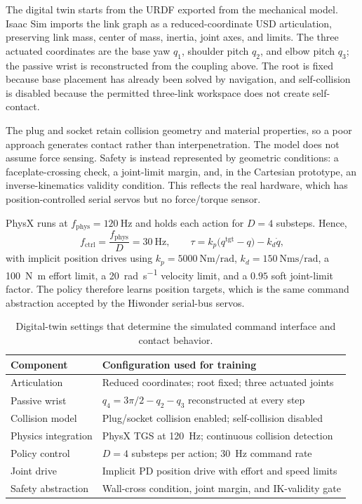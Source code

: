 The digital twin starts from the URDF exported from the mechanical model. Isaac Sim imports the link graph as a reduced-coordinate USD articulation, preserving link mass, center of mass, inertia, joint axes, and limits. The three actuated coordinates are the base yaw $q_1$, shoulder pitch $q_2$, and elbow pitch $q_3$; the passive wrist is reconstructed from the coupling above. The root is fixed because base placement has already been solved by navigation, and self-collision is disabled because the permitted three-link workspace does not create self-contact.

The plug and socket retain collision geometry and material properties, so a poor approach generates contact rather than interpenetration. The model does not assume force sensing. Safety is instead represented by geometric conditions: a faceplate-crossing check, a joint-limit margin, and, in the Cartesian prototype, an inverse-kinematics validity condition. This reflects the real hardware, which has position-controlled serial servos but no force/torque sensor.

PhysX runs at $f_{\mathrm{phys}}=\SI{120}{\hertz}$ and holds each action for $D=4$ substeps. Hence,
\begin{equation*}
f_{\mathrm{ctrl}}=\frac{f_{\mathrm{phys}}}{D}=\SI{30}{\hertz},\qquad
\tau=k_p\big(q^{\mathrm{tgt}}-q\big)-k_d\dot q,
\end{equation*}
with implicit position drives using $k_p=\SI{5000}{\newton\meter\per\radian}$, $k_d=\SI{150}{\newton\meter\second\per\radian}$, a \SI{100}{\newton\meter} effort limit, a \SI{20}{\radian\per\second} velocity limit, and a $0.95$ soft joint-limit factor. The policy therefore learns position targets, which is the same command abstraction accepted by the Hiwonder serial-bus servos.

\begin{table}[!ht]
\centering
\caption{Digital-twin settings that determine the simulated command interface and contact behavior.}
\label{rl:tab:rl-twin-settings}
\small
\setlength{\tabcolsep}{4pt}
\begin{tabular}{@{}ll@{}}
\toprule
Component & Configuration used for training \\
\midrule
Articulation & Reduced coordinates; root fixed; three actuated joints \\
Passive wrist & $q_4=3\pi/2-q_2-q_3$ reconstructed at every step \\
Collision model & Plug/socket collision enabled; self-collision disabled \\
Physics integration & PhysX TGS at \SI{120}{\hertz}; continuous collision detection \\
Policy control & $D=4$ substeps per action; \SI{30}{\hertz} command rate \\
Joint drive & Implicit PD position drive with effort and speed limits \\
Safety abstraction & Wall-cross condition, joint margin, and IK-validity gate \\
\bottomrule
\end{tabular}
\end{table}

